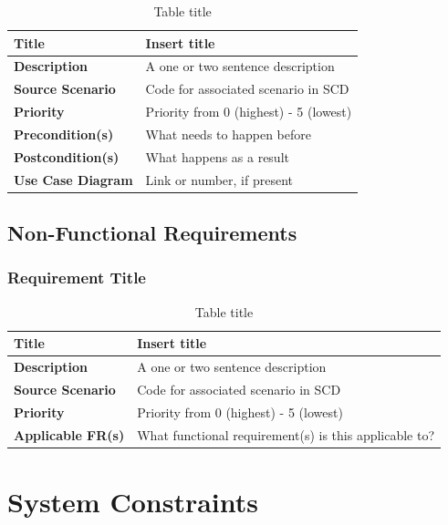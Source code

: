 \documentclass{article}
\begin{document}
\begin{table}[H]
\caption{Table title}
\begin{tabularx}{\textwidth}{|l|X|}
    \hline
    \textbf{Title} & Insert title \\ \hline
    \textbf{Description} &  A one or two sentence description \\ \hline 
    \textbf{Source Scenario} &  Code for associated scenario in SCD \\ \hline
    \textbf{Priority} &  Priority from 0 (highest) - 5 (lowest) \\ \hline 
    \textbf{Precondition(s)} &  What needs to happen before \\ \hline
    \textbf{Postcondition(s)} &  What happens as a result \\ \hline
    \textbf{Use Case Diagram} &  Link or number, if present \\  \hline                 
\end{tabularx}
\end{table}

\subsection{Non-Functional Requirements}


\subsubsection{Requirement Title}

\begin{table}[H]
\caption{Table title}
\begin{tabularx}{\textwidth}{|l|X|}
    \hline
    \textbf{Title} & Insert title \\ \hline
    \textbf{Description} &  A one or two sentence description \\ \hline 
    \textbf{Source Scenario} &  Code for associated scenario in SCD \\ \hline
    \textbf{Priority} &  Priority from 0 (highest) - 5 (lowest) \\ \hline 
    \textbf{Applicable FR(s)} &  What functional requirement(s) is this applicable to? \\ \hline            
\end{tabularx}
\end{table}

\pagebreak

\section{System Constraints}
\end{document}
